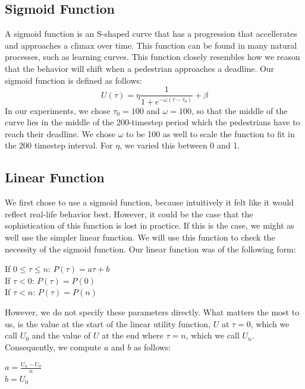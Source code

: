 \documentclass[11pt, a4paper]{book}
\begin{document}
\subsection{Sigmoid Function}
A sigmoid function is an S-shaped curve that has a progression that accellerates and approaches a climax over time. This function can be found in many natural processes, such as learning curves. This function closely resembles how we reason that the behavior will shift when a pedestrian approaches a deadline.
Our sigmoid function is defined as follows:
\begin{equation}
U(\tau) = \eta \frac{1}{1+e^{-\omega(\tau-\tau_0)}} + \beta
\end{equation}
In our experiments, we chose $\tau_0=100$ and $\omega=100$, so that the middle of the curve lies in the middle of the 200-timestep period which the pedestrians have to reach their deadline. We chose $\omega$ to be 100 as well to scale the function to fit in the 200 timestep interval. For $\eta$, we varied this between 0 and 1.


\subsection{Linear Function}
We first chose to use a sigmoid function, because intuitively it felt like it would reflect real-life behavior best. However, it could be the case that the sophistication of this function is lost in practice. If this is the case, we might as well use the simpler linear function. We will use this function to check the necessity of the sigmoid function. Our linear function was of the following form:
\begin{center}
If $0 \leq \tau \leq n$: $P(\tau) = a\tau + b$\\
If $\tau<0$: $P(\tau) = P(0)$\\
If $\tau<n$: $P(\tau) = P(n)$
\end{center}
However, we do not specify these parameters directly. What matters the most to us, is the value at the start of the linear utility function, $U$ at $\tau=0$, which we call $U_0$ and the value of $U$ at the end where $\tau=n$, which we call $U_n$. Consequently, we compute $a$ and $b$ as follows:
\begin{center}
$a = \frac{U_n - U_0}{n}$\\
$b = U_0$
\end{center}
\end{document}
